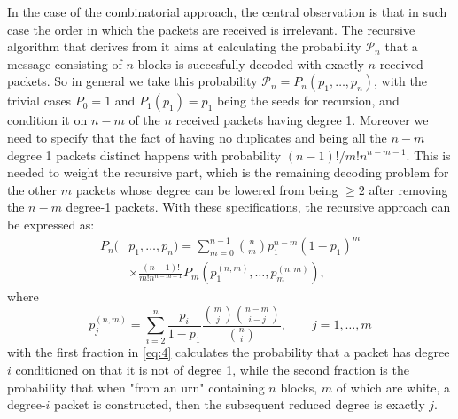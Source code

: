 In the case of the combinatorial approach, the central observation is that in such case the order in which the packets are received is irrelevant. The recursive algorithm that derives from it aims at calculating the probability $\mathcal{P}_n$ that a message consisting of $n$ blocks is succesfully decoded with exactly $n$ received packets. So in general we take this probability $\mathcal{P}_n = P_n(p_1,\dots,p_n)$, with the trivial cases $P_0=1$ and $P_1(p_1) = p_1$ being the seeds for recursion, and condition it on $n-m$ of the $n$ received packets having degree 1. Moreover we need to specify that the fact of having no duplicates and being all the $n-m$ degree 1 packets distinct happens with probability $(n-1)!/m!n^{n-m-1}$. This is needed to weight the recursive part, which is the remaining decoding problem for the other $m$ packets whose degree can be lowered from being $\geq 2$ after removing the $n-m$ degree-1 packets. With these specifications, the recursive approach can be expressed as:
\begin{align}
    P_n(&p_1,\dots,p_n) = \sum_{m=0}^{n-1}\binom{n}{m}p_1^{n-m}(1-p_1)^m\\
    &\times\frac{(n-1)!}{m!n^{n-m-1}}P_m(p_1^{(n,m)},\dots,p_m^{(n,m)}),
    \label{eq:3}
\end{align}
where
\begin{equation}
  p_j^{(n,m)} = \sum_{i=2}^{n}\frac{p_i}{1-p_1}\frac{\binom{m}{j}\binom{n-m}{i-j}}{\binom{n}{i}}, \qquad j = 1,\dots,m
  \label{eq:4}
\end{equation}
with the first fraction in \ref{eq:4} calculates the probability that a packet has degree $i$ conditioned on that it is not of degree 1, while the second fraction is the probability that when "from an urn" containing $n$ blocks, $m$ of which are white, a degree-$i$ packet is constructed, then the subsequent reduced degree is exactly $j$\cite{Hyytia2007}.

